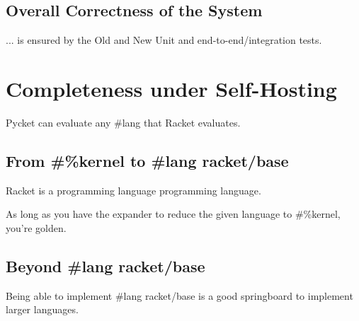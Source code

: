 		\subsection{Overall Correctness of the System}

			\begin{mainpoint}
				... is ensured by the Old and New Unit and end-to-end/integration tests.
			\end{mainpoint}

	\section{Completeness under Self-Hosting}

		\begin{mainpoint}
			Pycket can evaluate any \#lang that Racket evaluates.
		\end{mainpoint}

		\subsection{From \#\%kernel to \#lang racket/base}
			\begin{mainpoint}
				Racket is a programming language programming language.

				As long as you have the expander to reduce the given language to \#\%kernel, you're golden.
			\end{mainpoint}

		\subsection{Beyond \#lang racket/base}
			\begin{mainpoint}
				Being able to implement \#lang racket/base is a good springboard to implement larger languages.
			\end{mainpoint}